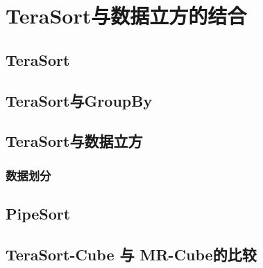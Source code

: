 \chapter{TeraSort与数据立方的结合}

\section{TeraSort}

\section{TeraSort与GroupBy}

\section{TeraSort与数据立方}

\subsection{数据划分}




\section{PipeSort}

\section{TeraSort-Cube 与 MR-Cube的比较}